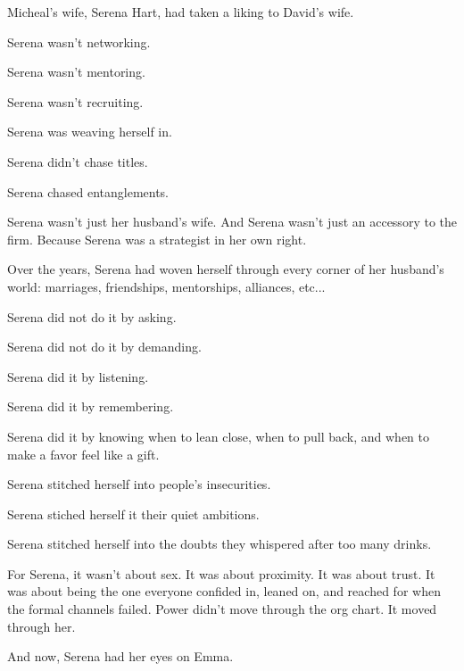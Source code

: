 \medskip

Micheal's wife, Serena Hart, had taken a liking to David’s wife.

Serena wasn’t networking.  

Serena wasn’t mentoring.  

Serena wasn’t recruiting.  

Serena was weaving herself in.

Serena didn’t chase titles. 

Serena chased entanglements.  

Serena wasn’t just her husband’s wife. 
And Serena wasn’t just an accessory to the firm.  
Because Serena was a strategist in her own right. 

Over the years, Serena had woven herself through every corner of her husband’s world:  
marriages, friendships, mentorships, alliances, etc...  

Serena did not do it by asking. 

Serena did not do it by demanding.  

Serena did it by listening. 

Serena did it by remembering. 

Serena did it by knowing when to lean close, when to pull back, and when to make a favor feel like a gift.

Serena stitched herself into people’s insecurities. 

Serena stiched herself it their quiet ambitions. 

Serena stitched herself into the doubts they whispered after too many drinks.  

For Serena, it wasn’t about sex.  
It was about proximity.  
It was about trust.  
It was about being the one everyone confided in, 
leaned on, and reached for when the formal channels failed.
Power didn’t move through the org chart.  
It moved through her.  

And now, Serena had her eyes on Emma.

\medskip

